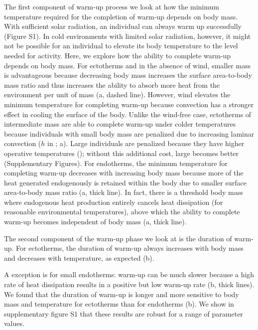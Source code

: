 The first component of warm-up process we look at how the minimum temperature required for the completion of warm-up depends on body mass.
With sufficient solar radiation, an individual can always warm up successfully (Figure S1).
In cold environments with limited solar radiation, however, it might not be possible for an individual to elevate its body temperature to the level needed for activity.
Here, we explore how the ability to complete warm-up depends on body mass.
For ectotherms and in the absence of wind, smaller mass is advantageous because decreasing body mass increases the surface area-to-body mass ratio and thus increases the ability to absorb more heat from the environment per unit of mass (a, dashed line).
However, wind elevates the minimum temperature for completing warm-up because convection has a stronger effect in cooling the surface of the body.
Unlike the wind-free case, ectotherms of intermediate mass are able to complete warm-up under colder temperatures because individuals with small body mass are penalized due to increasing laminar convection ($h$ in ; a).
Large individuals are penalized because they have higher operative temperatures (); without this additional cost, large becomes better (Supplementary Figures).
For endotherms, the minimum temperature for completing warm-up decreases with increasing body mass because more of the heat generated endogenously is retained within the body due to smaller surface area-to-body mass ratio (a, thick line).
In fact, there is a threshold body mass where endogenous heat production entirely cancels heat dissipation (for reasonable environmental temperatures), above which the ability to complete warm-up becomes independent of body mass (a, thick line).

The second component of the warm-up phase we look at is the duration of warm-up.
For ectotherms, the duration of warm-up always increases with body mass and decreases with temperature, as expected (b).

A exception is for small endotherms: warm-up can be much slower because a high rate of heat dissipation results in a positive but low warm-up rate (b, thick lines).
We found that the duration of warm-up is longer and more sensitive to body mass and temperature for ectotherms than for endotherms (b).
We show in supplementary figure S1 that these results are robust for a range of parameter values.

